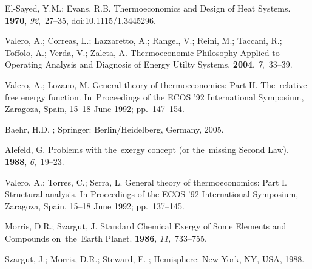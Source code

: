 \documentclass[energies,article,accept,moreauthors,pdftex]{Definitions/mdpi}
\begin{document}
\begin{thebibliography}{999}
	
	El-Sayed, Y.M.; Evans, R.B.
	\newblock Thermoeconomics and Design of Heat Systems.
	 {\bf 1970}, {\em 92},~27--35, doi:10.1115/1.3445296.

	
	Valero, A.; Correas, L.; Lazzaretto, A.; Rangel, V.; Reini, M.; Taccani, R.;
	Toffolo, A.; Verda, V.; Zaleta, A.
	\newblock Thermoeconomic Philosophy Applied to Operating Analysis and Diagnosis
	of Energy Utilty Systems.
	 {\bf 2004}, {\em 7},~33--39.

	

	
	Valero, A.; Lozano, M.
	\newblock General theory of thermoeconomics: Part II. The~relative free energy
	function.
	\newblock  In~Proceedings of the ECOS '92 International Symposium, Zaragoza, Spain, 15--18 June 1992; pp.~147--154. 
	
	Baehr, H.D.
	; Springer: Berlin/Heidelberg, Germany, 2005.

	
	Alefeld, G.
	\newblock Problems with the~exergy concept (or the~missing {S}econd {L}aw).
	 {\bf 1988}, {\em 6},~19--23.

	
	Valero, A.; Torres, C.; Serra, L.
	\newblock General theory of thermoeconomics: Part I. Structural analysis.
	\newblock  In Proceedings of the ECOS '92 International Symposium, Zaragoza, Spain, 15--18 June 1992; pp.~137--145.

	
	Morris, D.R.; Szargut, J.
	\newblock Standard Chemical Exergy of Some Elements and Compounds on~the~Earth
	Planet.
	 {\bf 1986}, {\em 11},~733--755.

	
	Szargut, J.; Morris, D.R.; Steward, F.
	; Hemisphere: New York, NY, USA, 1988.


\end{thebibliography}
\end{document}
